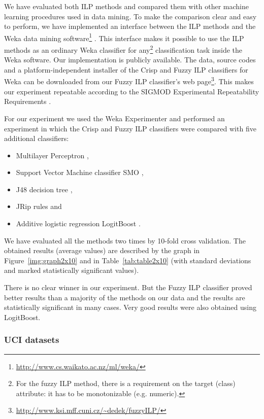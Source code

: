 We have evaluated both ILP methods and compared them with other machine learning procedures used in data mining. To make the comparison clear and easy to perform, we have implemented an interface between the ILP methods and the Weka data mining software\footnote{\url{http://www.cs.waikato.ac.nz/ml/weka/}} \citep{biblio:Weka}. This interface makes it possible to use the ILP methods as an ordinary Weka classifier for any\footnote{For the fuzzy ILP method, there is a requirement on the target (class) attribute: it has to be monotonizable (e.g. numeric).} classification task inside the Weka software. Our implementation is publicly available. The data, source codes and a platform-independent installer of the Crisp and Fuzzy ILP classifiers for Weka can be downloaded from our Fuzzy ILP classifier's web page\footnote{\url{http://www.ksi.mff.cuni.cz/~dedek/fuzzyILP/}}. This makes our experiment repeatable according to the
SIGMOD Experimental Repeatability Requirements \citep{biblio:SIGMODrepeatability}.


For our experiment we used the Weka Experimenter and performed an experiment in which the Crisp and Fuzzy ILP classifiers were compared with five additional classifiers:
\begin{itemize}
	\item Multilayer Perceptron \citep{biblio:bishop-1995},
	\item Support Vector Machine classifier SMO \citep{biblio:SMO},
	\item J48 decision tree \citep{biblio:J48},
	\item JRip rules \citep{weka:JRip} and
	\item Additive logistic regression LogitBoost \citep{biblio:LogitBoost}.
\end{itemize}
We have evaluated all the methods two times by 10-fold cross validation. %
The obtained results (average values) are described by the graph in Figure~\ref{img:graph2x10} and in Table~\ref{tab:table2x10} (with standard deviations and marked statistically significant values).

There is no clear winner in our experiment. But the Fuzzy ILP classifier proved better results than a majority of the methods on our data and the results are statistically significant in many cases. Very good results were also obtained using LogitBoost. 


\subsubsection*{UCI datasets}



